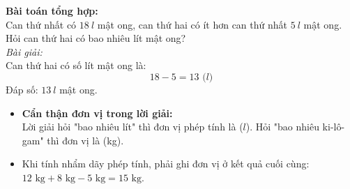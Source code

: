 \documentclass[11pt,a4paper]{article}
\begin{document}
\vspace{-1.5mm}
\noindent
\begin{minipage}[t]{0.49\textwidth}\vspace{0pt}
\begin{tcolorbox}[
  enhanced,
  colback=green!4!white,
  colframe=green!60!black,
  arc=2mm, boxrule=0.8pt,
  left=2mm, right=2mm, top=1.8mm, bottom=1.8mm,
  title={\footnotesize\bfseries\color{white}\faCheckCircle\ 4. Ví dụ thực hành chuẩn mực}
]
{\footnotesize
\textbf{Bài toán tổng hợp:}\\
Can thứ nhất có $18\ l$ mật ong, can thứ hai có ít hơn can thứ nhất $5\ l$ mật ong. Hỏi can thứ hai có bao nhiêu lít mật ong?\\
\textit{Bài giải:}\\
Can thứ hai có số lít mật ong là:
$$18 - 5 = 13\text{ (}l\text{)}$$
Đáp số: $13\ l$ mật ong.
}
\end{tcolorbox}
\end{minipage}
\hfill
\begin{minipage}[t]{0.49\textwidth}\vspace{0pt}
\begin{tcolorbox}[
  enhanced,
  colback=red!4!white,
  colframe=red!75!black,
  arc=2mm, boxrule=0.8pt,
  left=2mm, right=2mm, top=1.8mm, bottom=1.8mm,
  title={\footnotesize\bfseries\color{white}\faExclamationTriangle\ 5. Mẹo tránh bẫy trắc nghiệm}
]
{\footnotesize
\begin{itemize}\setlength{\itemsep}{1pt}\setlength{\leftskip}{-2.5mm}
  \item \textbf{Cẩn thận đơn vị trong lời giải:}\\
  Lời giải hỏi "bao nhiêu lít" thì đơn vị phép tính là ($l$). Hỏi "bao nhiêu ki-lô-gam" thì đơn vị là (kg).
  \item Khi tính nhẩm dãy phép tính, phải ghi đơn vị ở kết quả cuối cùng: $12\text{ kg} + 8\text{ kg} - 5\text{ kg} = 15\text{ kg}$.
\end{itemize}
}
\end{tcolorbox}
\end{minipage}
\end{document}

